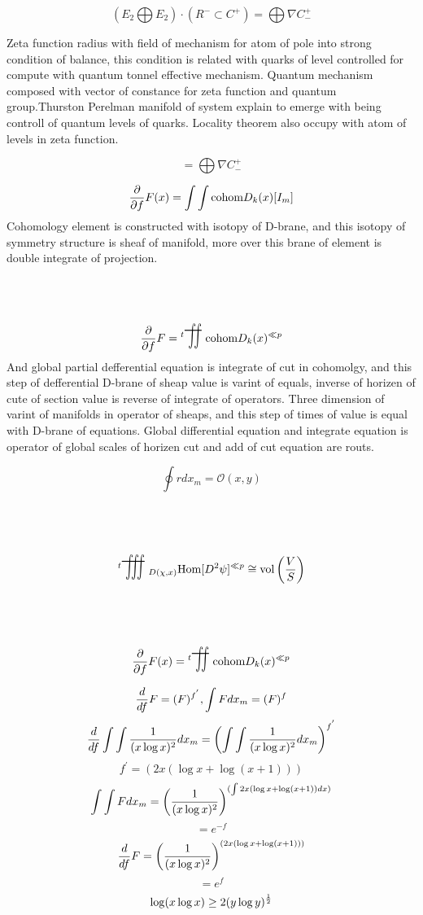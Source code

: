\documentclass{jsarticle}
\begin{document}
$$ (E_2 \bigoplus E_2) \cdot (R^{-} \subset C^{+})  = 
\bigoplus \nabla C^{+}_{-} $$


    Zeta function radius with field of mechanism for
atom of pole into strong condition of balance,
this condition is related with quarks of level controlled for compute with quantum tonnel effective mechanism.
Quantum mechanism composed with vector of constance for 
zeta function and quantum group.Thurston Perelman 
manifold of system explain to emerge with 
being controll of quantum levels of quarks.
Locality theorem also occupy with atom of levels in zeta function.

$$ = \bigoplus \nabla C^{+}_{-} $$

\newcommand{\variint}{%
	\begin{picture}(15,30)
		\put(0,0){
			$ \iint $}
		\put(0,5){\line(15,0){15}}
	\end{picture} %
}

\newcommand{\variiint}{%
	\begin{picture}(20,30)
		\put(0,0){
			$ \iiint $}
		\put(0,5){\line(15,0){20}}
	\end{picture} %
}



 $$ {\partial \over \partial f}F(x) = \int \int \text{cohom}D_k(x)[I_m]  $$
 Cohomology element is constructed with isotopy of D-brane,
 and this isotopy of symmetry structure is sheaf of manifold,
 more over this brane of element is double integrate of projection.
 $$ {\partial \over \partial f}F = {{}^t \scalebox{1}[2]{\variint}} \text{cohom}D_k(x)^{\ll p} $$
 And global partial defferential equation is integrate of cut in cohomolgy,
 and this step of defferential D-brane of sheap value is varint of equals,
 inverse of horizen of cute of section value is reverse of integrate of 
 operators. Three dimension of varint of manifolds in operator of sheaps,
 and this step of times of value is equal with D-brane of equations.
 Global differential equation and integrate equation is operator of 
 global scales of horizen cut and add of cut equation are routs.

 $$ \oint r dx_m = \mathcal{O}(x,y) $$

 $$ {{}^t {\scalebox{1}[2]{\variiint}}}_{{D(\chi,x)}} \text{Hom}[D^2 \psi]^{\ll p} \cong 
 \text{vol}\left({V \over S}\right) $$

 $$ {\partial \over \partial f}F(x) = {{}^t {\scalebox{1}[2]{\variint}}} 
 \text{cohom}D_k(x)^{\ll p} $$

 $$ {d \over df}F = (F)^{f^{'}}, \int F dx_m = (F)^{f}  $$
 $$ {d \over df}\int \int{1 \over (x \log x)^2}dx_m =
 \left(\int \int{1 \over (x \log x)^2}dx_m \right)^{f^{'}}  $$
 $$ f^{'} = (2x (\log x + \log (x + 1))) $$
  $$  \int \int F dx_m = \left({1 \over (x \log x)^2}\right)^{
	  (\int 2x (\log x + \log (x + 1))dx)} $$ 
   $$= e^{-f} $$
  $$ {d \over df}F = \left({1 \over (x \log x)^2}\right)^{
	  (2x (\log x + \log (x + 1))) } $$  
  $$= e^{f} $$
  $$ \log (x \log x) \ge 2(y \log y)^{1 \over 2} $$
\end{document}
